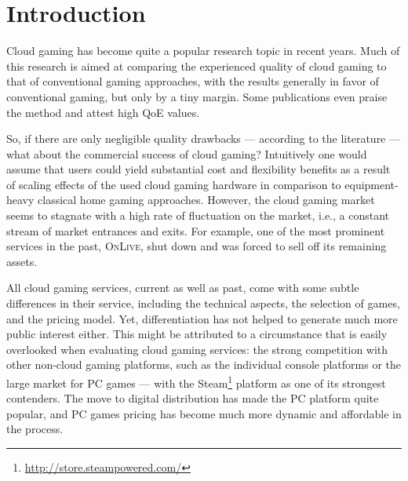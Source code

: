 

\section{Introduction}

Cloud gaming has become quite a popular research topic in recent years. 
Much of this research is aimed at comparing the experienced 
quality of cloud gaming to that of conventional gaming approaches, with 
the results
generally in favor of conventional gaming, but only by a 
tiny margin. Some publications even praise the method and attest high 
\gls{QoE} values.

So, if there are only negligible quality drawbacks --- according to the 
literature --- what about the commercial success of cloud gaming? Intuitively one would assume that users could yield substantial cost and flexibility benefits as a result of scaling effects of the used cloud gaming hardware in comparison to equipment-heavy classical home gaming approaches. However, the cloud gaming market seems to stagnate with a high rate of fluctuation on the market, i.e., a constant stream of market entrances and exits. For example, one of the most prominent services in the past, \textsc{OnLive}, shut down and was forced to 
sell off its remaining assets.



All cloud gaming services, current as well 
as past, come with some subtle differences in their service, including 
the technical aspects, the selection of games, and the pricing 
model.
Yet, differentiation has not helped to generate much more public 
interest either. 
This might be attributed to a circumstance that is easily  
overlooked when evaluating cloud gaming services: the strong 
competition with other non-cloud gaming platforms, such as the 
individual console platforms or the large market for PC games --- with the 
Steam\footnote{\url{http://store.steampowered.com/}} platform as one of 
its strongest contenders. The move to digital distribution has made the 
PC platform quite popular, and PC games pricing has become 
much more dynamic and affordable in the process.

